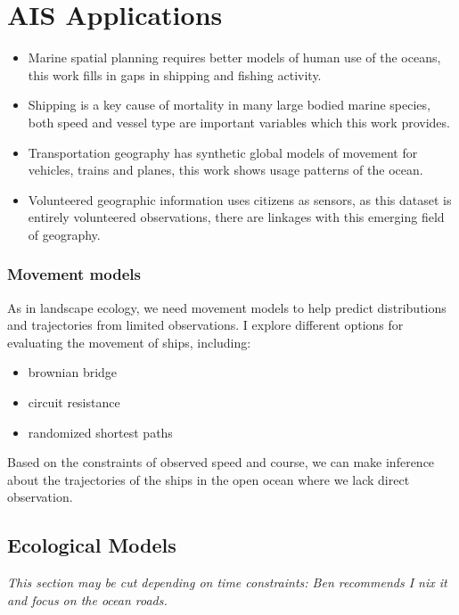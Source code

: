 \chapter{AIS Applications}
\label{cha:applications}

\begin{itemize}
 \item Marine spatial planning requires better models of human use of the oceans, this work fills in gaps in shipping and fishing activity.
 \item Shipping is a key cause of mortality in many large bodied marine species, both speed and vessel type are important variables which this work provides.
 \item Transportation geography has synthetic global models of movement for vehicles, trains and planes, this work shows usage patterns of the ocean.
 \item Volunteered geographic information uses citizens as sensors, as this dataset is entirely volunteered observations, there are linkages with this emerging field of geography.
\end{itemize}


\subsection{Movement models}

  As in landscape ecology, we need movement models to help predict distributions and trajectories from limited observations. I explore different options for evaluating the movement of ships, including:
\begin{itemize}
 \item brownian bridge
 \item circuit resistance
 \item randomized shortest paths
\end{itemize}

  Based on the constraints of observed speed and course, we can make inference about the trajectories of the ships in the open ocean where we lack direct observation.


\section{Ecological Models}

\textit{This section may be cut depending on time constraints: Ben recommends I nix it and focus on the ocean roads.}

